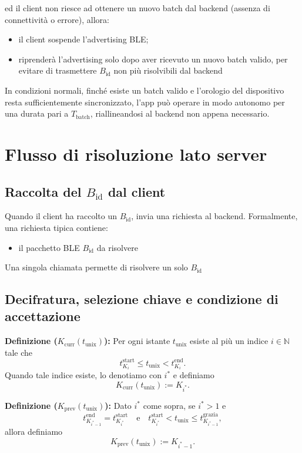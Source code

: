 \documentclass[a4paper,11pt]{article}
\begin{document}
ed il client non riesce ad ottenere un nuovo batch dal backend (assenza di connettività o errore), allora:
\begin{itemize}
  \item il client sospende l'advertising BLE;
  \item riprenderà l'advertising solo dopo aver ricevuto un nuovo batch valido, per evitare di trasmettere $B_{\text{id}}$ non più risolvibili dal backend
\end{itemize}

In condizioni normali, finché esiste un batch valido e l'orologio del dispositivo resta sufficientemente sincronizzato, l'app può operare in modo autonomo per una durata pari a $T_{\text{batch}}$, riallineandosi al backend non appena necessario.

\section{Flusso di risoluzione lato server}
\subsection{Raccolta del \(B_{\text{id}}\) dal client}
Quando il client ha raccolto un $B_{\text{id}}$, invia una richiesta al backend.
Formalmente, una richiesta tipica contiene:
\begin{itemize}
  \item il pacchetto BLE \(B_{\text{id}}\) da risolvere
\end{itemize}

Una singola chiamata permette di risolvere un solo $B_{\text{id}}$

\subsection{Decifratura, selezione chiave e condizione di accettazione}
\textbf{Definizione (\(K_{\text{curr}}(t_{\text{unix}})\)):} Per ogni istante \(t_{\text{unix}}\) esiste al più un indice \(i \in \mathbb{N}\) tale che
\[
  t_{K_i}^{\text{start}} \le t_{\text{unix}} < t_{K_i}^{\text{end}}.
\]
Quando tale indice esiste, lo denotiamo con \(i^\ast\) e definiamo
\[
  K_{\text{curr}}(t_{\text{unix}}) := K_{i^\ast}.
\]

\textbf{Definizione (\(K_{\text{prev}}(t_{\text{unix}})\)):} Dato \(i^\ast\) come sopra, se \(i^\ast > 1\) e
\[
  t_{K_{i^\ast-1}}^{\text{end}} = t_{K_{i^\ast}}^{\text{start}}
  \quad\text{e}\quad
  t_{K_{i^\ast}}^{\text{start}} < t_{\text{unix}} \le t_{K_{i^\ast-1}}^{\text{grazia}},
\]
allora definiamo
\[
  K_{\text{prev}}(t_{\text{unix}}) := K_{i^\ast-1}.
\]
\end{document}
